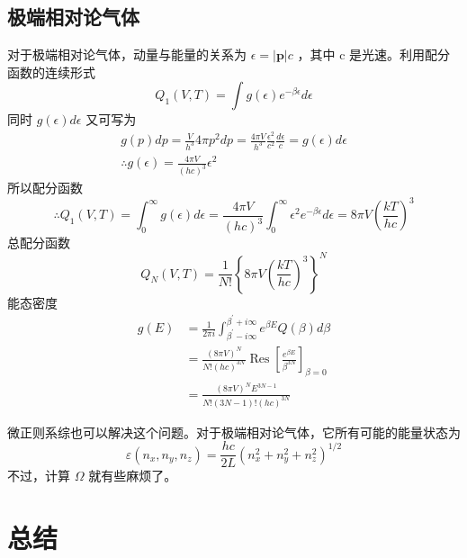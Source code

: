 \subsection{极端相对论气体}
对于极端相对论气体，动量与能量的关系为 $\epsilon = |\bm{p}| c$ ，其中 c 是光速。利用配分函数的连续形式
\[
    Q_1(V, T)=\int g(\epsilon) e^{-\beta \epsilon} d \epsilon
\]
同时 $g(\epsilon) d \epsilon$ 又可写为
\begin{equation}
    \begin{gathered}
        g(p) d p=\frac{V}{h^3} 4 \pi p^2 d p=\frac{4 \pi V}{h^3} \frac{\epsilon^2}{c^2} \frac{d \epsilon}{c}=g(\epsilon) d \epsilon \\
        \therefore g(\epsilon)=\frac{4 \pi V}{(h c)^3} \epsilon^2
        \end{gathered}
\end{equation}
所以配分函数
\begin{equation}
    \therefore Q_1(V, T)=\int_0^{\infty} g(\epsilon) d \epsilon=\frac{4 \pi V}{(h c)^3} \int_0^{\infty} \epsilon^2 e^{-\beta \epsilon} d \epsilon=8 \pi V\left(\frac{k T}{h c}\right)^3
\end{equation}
总配分函数
\begin{equation}
    Q_N(V, T)=\frac{1}{N !}\left\{8 \pi V\left(\frac{k T}{h c}\right)^3\right\}^N
\end{equation}
能态密度
\begin{equation}
    \begin{aligned}
        g(E) & =\frac{1}{2 \pi i} \int_{\beta^{\prime}-i \infty}^{\beta^{\prime}+i \infty} e^{\beta E} Q(\beta) d \beta \\
        & =\frac{(8 \pi V)^N}{N !(h c)^{3 N}} \operatorname{Res}\left[\frac{e^{\beta E}}{\beta^{3 N}}\right]_{\beta=0} \\
        & =\frac{(8 \pi V)^N E^{3 N-1}}{N !(3 N-1) !(h c)^{3 N}}
        \end{aligned}
\end{equation}

微正则系综也可以解决这个问题。对于极端相对论气体，它所有可能的能量状态为
\begin{equation}
    \varepsilon\left(n_x, n_y, n_z\right)=\frac{h c}{2 L}\left(n_x^2+n_y^2+n_z^2\right)^{1 / 2}
\end{equation}
不过，计算 $\Omega$ 就有些麻烦了。

\section{总结}\label{sec:正则系综总结}

